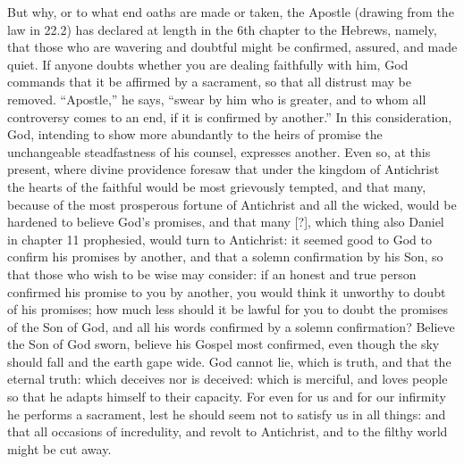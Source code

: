 But why, or to what end oaths are made or taken, the Apostle (drawing from the law in 22.2) has declared at length in the 6th chapter to the Hebrews, namely, that those who are wavering and doubtful might be confirmed, assured, and made quiet. If anyone doubts whether you are dealing faithfully with him, God commands that it be affirmed by a sacrament, so that all distrust may be removed. “Apostle,” he says, “swear by him who is greater, and to whom all controversy comes to an end, if it is confirmed by another.” In this consideration, God, intending to show more abundantly to the heirs of promise the unchangeable steadfastness of his counsel, expresses another. Even so, at this present, where divine providence foresaw that under the kingdom of Antichrist the hearts of the faithful would be most grievously tempted, and that many, because of the most prosperous fortune of Antichrist and all the wicked, would be hardened to believe God’s promises, and that many [?], which thing also Daniel in chapter 11 prophesied, would turn to Antichrist: it seemed good to God to confirm his promises by another, and that a solemn confirmation by his Son, so that those who wish to be wise may consider: if an honest and true person confirmed his promise to you by another, you would think it unworthy to doubt of his promises; how much less should it be lawful for you to doubt the promises of the Son of God, and all his words confirmed by a solemn confirmation? Believe the Son of God sworn, believe his Gospel most confirmed, even though the sky should fall and the earth gape wide. God cannot lie, which is truth, and that the eternal truth: which deceives nor is deceived: which is merciful, and loves people so that he adapts himself to their capacity. For even for us and for our infirmity he performs a sacrament, lest he should seem not to satisfy us in all things: and that all occasions of incredulity, and revolt to Antichrist, and to the filthy world might be cut away.

